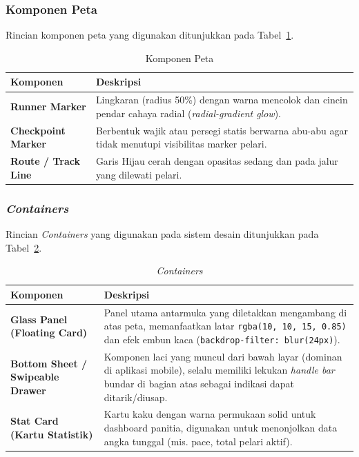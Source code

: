 \subsubsection{Komponen Peta}
\label{subsubsec:komponen-peta}
Rincian komponen peta yang digunakan ditunjukkan pada Tabel~\ref{tab:komponen-peta}.
\begin{table}[H]
    \centering
    \small
    \caption{Komponen Peta}
    \label{tab:komponen-peta}
    \begin{tabular}{|>{\bfseries}p{3.4cm}|p{9.4cm}|}
        \hline
        \textbf{Komponen} & \textbf{Deskripsi} \\
        \hline
        Runner Marker & Lingkaran (radius 50\%) dengan warna mencolok dan cincin pendar cahaya radial (\textit{radial-gradient glow}). \\
        \hline
        Checkpoint Marker & Berbentuk wajik atau persegi statis berwarna abu-abu agar tidak menutupi visibilitas marker pelari. \\
        \hline
        Route / Track Line & Garis Hijau cerah dengan opasitas sedang dan pada jalur yang dilewati pelari. \\
        \hline
    \end{tabular}
\end{table}
 
\subsubsection{\textit{Containers}}
\label{subsubsec:containers-surfaces}
 Rincian \textit{Containers} yang digunakan pada sistem desain ditunjukkan pada Tabel~\ref{tab:containers-surfaces}.
\begin{table}[H]
    \centering
    \small
    \caption{\textit{Containers}}
    \label{tab:containers-surfaces}
    \begin{tabular}{|>{\bfseries}p{3.4cm}|p{9.4cm}|}
        \hline
        \textbf{Komponen} & \textbf{Deskripsi} \\
        \hline
        Glass Panel (Floating Card) & Panel utama antarmuka yang diletakkan mengambang di atas peta, memanfaatkan latar \texttt{rgba(10, 10, 15, 0.85)} dan efek embun kaca (\texttt{backdrop-filter: blur(24px)}). \\
        \hline
        Bottom Sheet / Swipeable Drawer & Komponen laci yang muncul dari bawah layar (dominan di aplikasi mobile), selalu memiliki lekukan \textit{handle bar} bundar di bagian atas sebagai indikasi dapat ditarik/diusap. \\
        \hline
        Stat Card (Kartu Statistik) & Kartu kaku dengan warna permukaan solid untuk dashboard panitia, digunakan untuk menonjolkan data angka tunggal (mis. pace, total pelari aktif). \\
        \hline
    \end{tabular}
\end{table}

